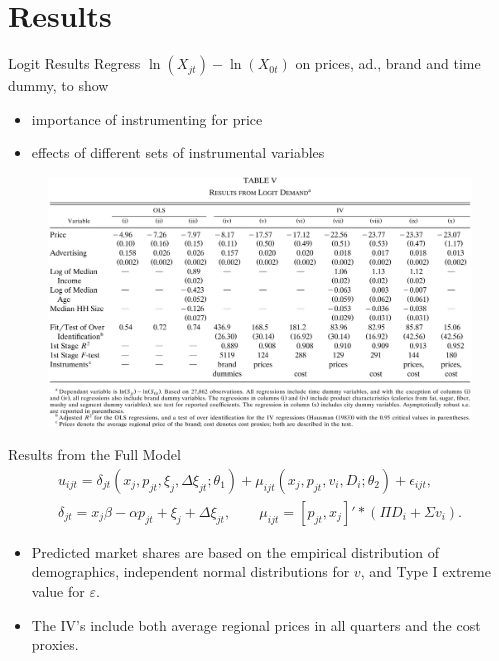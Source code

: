 \documentclass{beamer}
\begin{document}
\section{Results}
\begin{frame}
	\transfade
	\tableofcontents[sectionstyle=show/shaded,subsectionstyle=show/shaded/hide]
	\addtocounter{framenumber}{-1}
\end{frame}
\begin{frame}[label=logit]{Logit Results}
	Regress $\ln(X_{jt})-\ln(X_{0t})$ on prices, ad., brand and time dummy, to show
	\begin{itemize}
		\item importance of instrumenting for price
		\item effects of different sets of instrumental variables
	\end{itemize}

	\begin{figure}[h]
		\centering
		\includegraphics[scale=0.15]{table5.png}
	\end{figure}	
	\hyperlink{table8}{}
\end{frame}
\begin{frame}{Results from the Full Model}
	\begin{equation}\nonumber
		\begin{split}
			u_{ijt}=\delta_{jt}(x_j,p_{jt},\xi_j,\Delta\xi_{jt};\theta_1)+\mu_{ijt}(x_j,p_{jt},v_i,D_i;\theta_2)+\epsilon_{ijt},\\
			\delta_{jt}=x_j\beta-\alpha p_{jt}+\xi_j+\Delta\xi_{jt},\qquad \mu_{ijt}=[p_{jt},x_j]'*(\Pi D_i+\Sigma v_i).
		\end{split}
	\end{equation}
	\begin{itemize}
		\item Predicted market shares are based on the empirical distribution of 	demographics, independent normal distributions for $v$, and Type I extreme value for $\varepsilon$.
		\item The IV’s include both average regional prices in all quarters and the cost proxies.
	\end{itemize}	
\end{frame}
\end{document}
